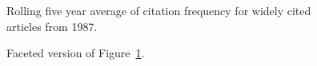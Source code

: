 \documentclass[
  10pt,
  letterpaper,
  DIV=11,
  numbers=noendperiod,
  twoside]{scrartcl}
\begin{document}
\begin{figure}


\caption{\label{fig-citation-spaghetti-1987}Rolling five year average of
citation frequency for widely cited articles from 1987.}

\end{figure}%

\begin{figure}


\caption{\label{fig-citation-facet-1987}Faceted version of
Figure~\ref{fig-citation-spaghetti-1987}.}

\end{figure}%
\end{document}
